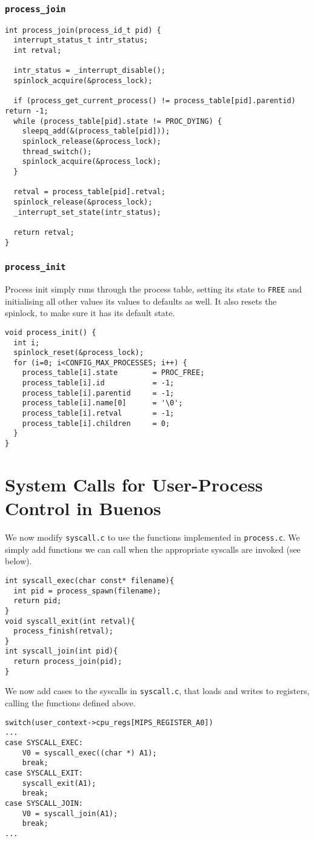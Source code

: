 \documentclass[a4paper,12pt]{article}
\begin{document}
\subsubsection{\texttt{process\_join}}
\begin{lstlisting}
int process_join(process_id_t pid) {
  interrupt_status_t intr_status;
  int retval;

  intr_status = _interrupt_disable();
  spinlock_acquire(&process_lock);

  if (process_get_current_process() != process_table[pid].parentid) return -1;
  while (process_table[pid].state != PROC_DYING) {
    sleepq_add(&(process_table[pid]));
    spinlock_release(&process_lock);
    thread_switch();
    spinlock_acquire(&process_lock);
  }

  retval = process_table[pid].retval;
  spinlock_release(&process_lock);
  _interrupt_set_state(intr_status);

  return retval;
} 
\end{lstlisting}

\subsubsection{\texttt{process\_init}}
Process init simply runs through the process table, setting its state to \texttt{FREE} and initialising all other values its values to defaults as well. It also resets the spinlock, to make sure it has its default state.
\begin{lstlisting}
void process_init() {
  int i;
  spinlock_reset(&process_lock);
  for (i=0; i<CONFIG_MAX_PROCESSES; i++) {
    process_table[i].state        = PROC_FREE;
    process_table[i].id           = -1;
    process_table[i].parentid     = -1;
    process_table[i].name[0]      = '\0'; 
    process_table[i].retval       = -1;
    process_table[i].children     = 0;
  }
}
\end{lstlisting}

\section{System Calls for User-Process Control in Buenos}
We now modify \texttt{syscall.c} to use the functions implemented in \texttt{process.c}. We simply add functions we can call when the appropriate syscalls are invoked (see below).
\begin{lstlisting}
int syscall_exec(char const* filename){
  int pid = process_spawn(filename);
  return pid;
}
void syscall_exit(int retval){
  process_finish(retval);
}
int syscall_join(int pid){
  return process_join(pid);
}
\end{lstlisting}

We now add cases to the syscalls in \texttt{syscall.c}, that loads and writes to registers, calling the functions defined above.
\begin{lstlisting}
switch(user_context->cpu_regs[MIPS_REGISTER_A0])
...
case SYSCALL_EXEC:
    V0 = syscall_exec((char *) A1);
    break;
case SYSCALL_EXIT:
    syscall_exit(A1);
    break;
case SYSCALL_JOIN:
    V0 = syscall_join(A1);
    break;
...
\end{lstlisting}
\end{document}
